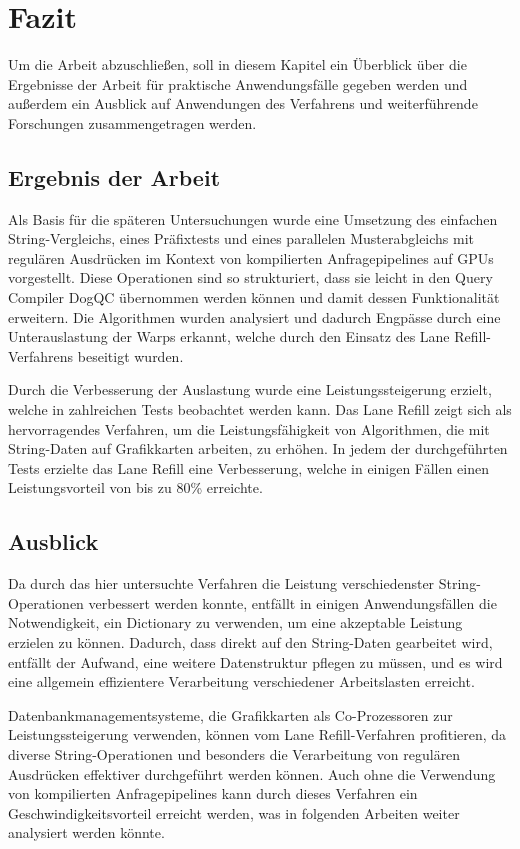 \chapter{Fazit}

Um die Arbeit abzuschließen, soll in diesem Kapitel ein Überblick über die Ergebnisse der Arbeit für praktische Anwendungsfälle gegeben werden und außerdem ein Ausblick auf Anwendungen des Verfahrens und weiterführende Forschungen zusammengetragen werden.

\section{Ergebnis der Arbeit}

Als Basis für die späteren Untersuchungen wurde eine Umsetzung des einfachen String-Vergleichs, eines Präfixtests und eines parallelen Musterabgleichs mit regulären Ausdrücken im Kontext von kompilierten Anfragepipelines auf GPUs vorgestellt.
Diese Operationen sind so strukturiert, dass sie leicht in den Query Compiler DogQC übernommen werden können und damit dessen Funktionalität erweitern.
Die Algorithmen wurden analysiert und dadurch Engpässe durch eine Unterauslastung der Warps erkannt, welche durch den Einsatz des Lane Refill-Verfahrens beseitigt wurden.

Durch die Verbesserung der Auslastung wurde eine Leistungssteigerung erzielt, welche in zahlreichen Tests beobachtet werden kann.
Das Lane Refill zeigt sich als hervorragendes Verfahren, um die Leistungsfähigkeit von Algorithmen, die mit String-Daten auf Grafikkarten arbeiten, zu erhöhen.
In jedem der durchgeführten Tests erzielte das Lane Refill eine Verbesserung, welche in einigen Fällen einen Leistungsvorteil von bis zu 80\% erreichte.


\section{Ausblick}

Da durch das hier untersuchte Verfahren die Leistung verschiedenster String-Operationen verbessert werden konnte, entfällt in einigen Anwendungsfällen die Notwendigkeit, ein Dictionary zu verwenden, um eine akzeptable Leistung erzielen zu können.
Dadurch, dass direkt auf den String-Daten gearbeitet wird, entfällt der Aufwand, eine weitere Datenstruktur pflegen zu müssen, und es wird eine allgemein effizientere Verarbeitung verschiedener Arbeitslasten erreicht.

Datenbankmanagementsysteme, die Grafikkarten als Co-Prozessoren zur Leistungssteigerung verwenden, können vom Lane Refill-Verfahren profitieren, da diverse String-Ope\-ra\-tio\-nen und besonders die Verarbeitung von regulären Ausdrücken effektiver durchgeführt werden können.
Auch ohne die Verwendung von kompilierten Anfragepipelines kann durch dieses Verfahren ein Geschwindigkeitsvorteil erreicht werden, was in folgenden Arbeiten weiter analysiert werden könnte.

